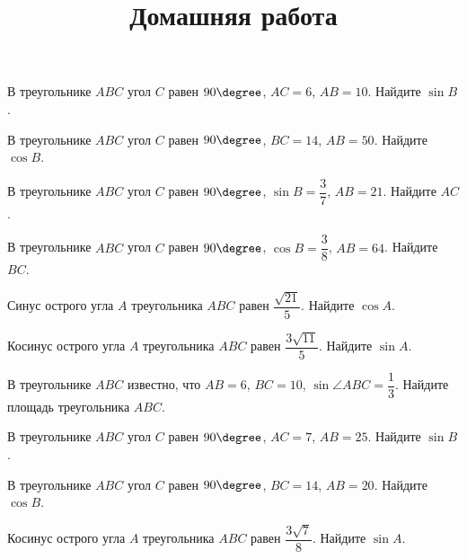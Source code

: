 \begin{class}[number=2]
	\begin{listofex}
		\item   В треугольнике \( ABC \) угол \( C \) равен \( 90\degree \), \( AC=6 \), \( AB=10 \). Найдите \( \sin B \).
		\item В треугольнике \( ABC \) угол \( C \) равен \( 90\degree \), \( BC=14 \), \( AB=50 \). Найдите \( \cos B \).
		\item В треугольнике \( ABC \) угол \( C \) равен  \( 90\degree \), \( \sin B=\dfrac{3}{7} \), \( AB=21 \). Найдите \( AC \).
		\item В треугольнике \( ABC \) угол \( C \) равен  \( 90\degree \), \( \cos B=\dfrac{3}{8} \), \( AB=64 \). Найдите \( BC \).
		\item Синус острого угла \( A \) треугольника \( ABC \) равен \( \dfrac{\sqrt{21}}{5} \). Найдите \( \cos A \).
		\item Косинус острого угла \( A \) треугольника \( ABC \) равен \( \dfrac{3\sqrt{11}}{5} \). Найдите \( \sin A \).
		\item В треугольнике \( ABC \) известно, что \( AB=6 \), \( BC=10 \), \( \sin\angle ABC=\dfrac{1}{3} \). Найдите площадь треугольника \( ABC \).
	\end{listofex}
	\newpage
	\title{Домашняя работа}
	\begin{listofex}
		\item В треугольнике \( ABC \) угол \( C \) равен \( 90\degree \), \( AC=7 \), \( AB=25 \). Найдите \( \sin B \).
		\item В треугольнике \( ABC \) угол \( C \) равен \( 90\degree \), \( BC=14 \), \( AB=20 \). Найдите \( \cos B \).
		\item Косинус острого угла \( A \) треугольника \( ABC \) равен \( \dfrac{3\sqrt{7}}{8} \). Найдите \( \sin A \).
	\end{listofex}
\end{class}

